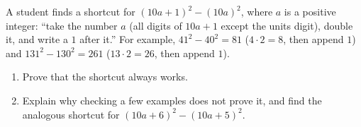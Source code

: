 A student finds a shortcut for $(10a+1)^2-(10a)^2$, where $a$ is a positive integer: ``take the number $a$ (all digits of $10a+1$ except the units digit), double it, and write a $1$ after it.'' For example, $41^2-40^2=81$ ($4\cdot2=8$, then append $1$) and $131^2-130^2=261$ ($13\cdot2=26$, then append $1$).
\begin{enumerate}
\item[(a)] Prove that the shortcut always works.
\item[(b)] Explain why checking a few examples does not prove it, and find the analogous shortcut for $(10a+6)^2-(10a+5)^2$.
\end{enumerate}
